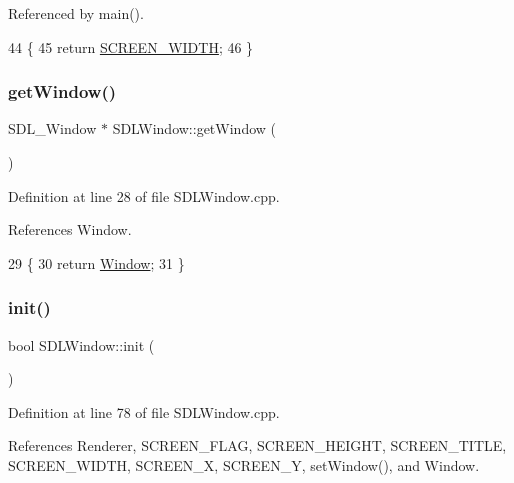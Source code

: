 Referenced by main().


\begin{DoxyCode}
44 \{
45     \textcolor{keywordflow}{return} \hyperlink{class_s_d_l_window_ab3faec77de829876613ea52176ef61e1}{SCREEN\_WIDTH};
46 \}
\end{DoxyCode}
\mbox{\label{class_s_d_l_window_a7b170e4afb9920aba42be65369cf98eb}} 
\subsubsection{\texorpdfstring{get\+Window()}{getWindow()}}
{\footnotesize\ttfamily S\+D\+L\+\_\+\+Window $\ast$ S\+D\+L\+Window\+::get\+Window (\begin{DoxyParamCaption}{ }\end{DoxyParamCaption})}



Definition at line 28 of file S\+D\+L\+Window.\+cpp.



References Window.


\begin{DoxyCode}
29 \{
30     \textcolor{keywordflow}{return} \hyperlink{class_s_d_l_window_aa95576b14f59ec62a9e7f6fb8c2f79cc}{Window};
31 \}
\end{DoxyCode}
\mbox{\label{class_s_d_l_window_ad0f1f0b8510c97c1eeeffffe30707b0c}} 
\subsubsection{\texorpdfstring{init()}{init()}}
{\footnotesize\ttfamily bool S\+D\+L\+Window\+::init (\begin{DoxyParamCaption}{ }\end{DoxyParamCaption})}



Definition at line 78 of file S\+D\+L\+Window.\+cpp.



References Renderer, S\+C\+R\+E\+E\+N\+\_\+\+F\+L\+AG, S\+C\+R\+E\+E\+N\+\_\+\+H\+E\+I\+G\+HT, S\+C\+R\+E\+E\+N\+\_\+\+T\+I\+T\+LE, S\+C\+R\+E\+E\+N\+\_\+\+W\+I\+D\+TH, S\+C\+R\+E\+E\+N\+\_\+X, S\+C\+R\+E\+E\+N\+\_\+Y, set\+Window(), and Window.



